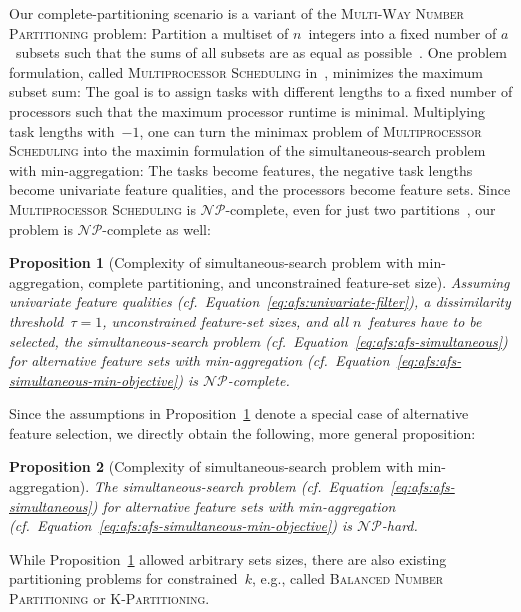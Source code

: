 \documentclass{article}
\newtheorem{proposition}{Proposition}
\theoremstyle{definition}
\begin{document}
Our complete-partitioning scenario is a variant of the \textsc{Multi-Way Number Partitioning} problem:
Partition a multiset of $n$~integers into a fixed number of $a$~subsets such that the sums of all subsets are as equal as possible~\cite{korf2010objective}.
One problem formulation, called \textsc{Multiprocessor Scheduling} in~\cite{garey2003computers}, minimizes the maximum subset sum:
The goal is to assign tasks with different lengths to a fixed number of processors such that the maximum processor runtime is minimal.
Multiplying task lengths with~$-1$, one can turn the minimax problem of \textsc{Multiprocessor Scheduling} into the maximin formulation of the simultaneous-search problem with min-aggregation:
The tasks become features, the negative task lengths become univariate feature qualities, and the processors become feature sets. 
Since \textsc{Multiprocessor Scheduling} is $\mathcal{NP}$-complete, even for just two partitions~\cite{garey2003computers}, our problem is $\mathcal{NP}$-complete as well:
%
\begin{proposition}[Complexity of simultaneous-search problem with min-aggregation, complete partitioning, and unconstrained feature-set size]
	Assuming univariate feature qualities (cf.~Equation~\ref{eq:afs:univariate-filter}), a dissimilarity threshold~$\tau = 1$, unconstrained feature-set sizes, and all $n$~features have to be selected, the simultaneous-search problem (cf.~Equation~\ref{eq:afs:afs-simultaneous}) for alternative feature sets with min-aggregation (cf.~Equation~\ref{eq:afs:afs-simultaneous-min-objective}) is $\mathcal{NP}$-complete.
	\label{prop:afs:complexity-partitioning-min-unconstrained-k}
\end{proposition}
%
Since the assumptions in Proposition~\ref{prop:afs:complexity-partitioning-min-unconstrained-k} denote a special case of alternative feature selection, we directly obtain the following, more general proposition:
%
\begin{proposition}[Complexity of simultaneous-search problem with min-aggregation]
	The simultaneous-search problem (cf.~Equation~\ref{eq:afs:afs-simultaneous}) for alternative feature sets with min-aggregation (cf.~Equation~\ref{eq:afs:afs-simultaneous-min-objective}) is $\mathcal{NP}$-hard.
	\label{prop:afs:complexity-simultaneous-np}
\end{proposition}
%
While Proposition~\ref{prop:afs:complexity-partitioning-min-unconstrained-k} allowed arbitrary sets sizes, there are also existing partitioning problems for constrained~$k$, e.g., called \textsc{Balanced Number Partitioning} or \textsc{K-Partitioning}.
\end{document}
